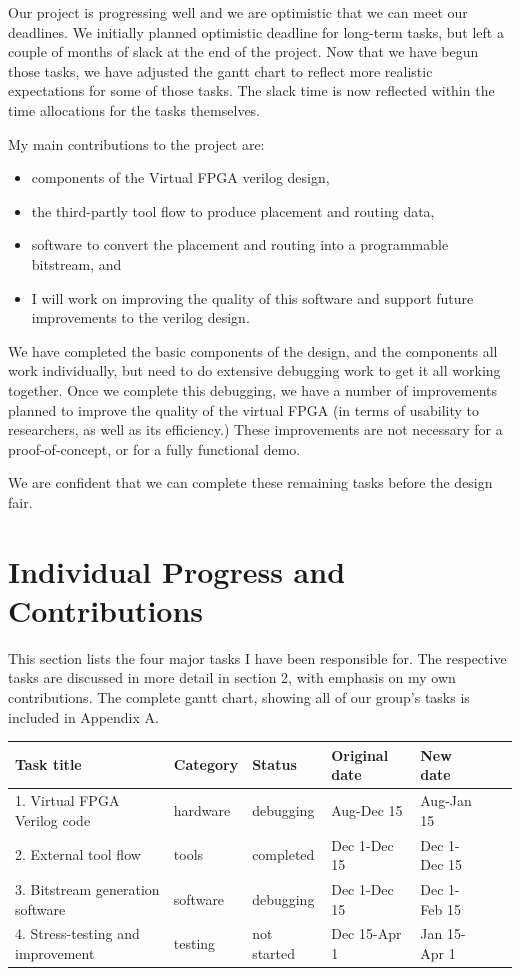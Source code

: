 \documentclass[12pt,letterpaper]{article}
\begin{document}
Our project is progressing well and we are optimistic that we can meet our deadlines.
We initially planned optimistic deadline for long-term tasks, but left a couple of months of slack at the end of the project.
Now that we have begun those tasks, we have adjusted the gantt chart to reflect more realistic expectations for some of those tasks.
The slack time is now reflected within the time allocations for the tasks themselves.

My main contributions to the project are:
\begin{itemize}
\item components of the Virtual FPGA verilog design,
\item the third-partly tool flow to produce placement and routing data,
\item software to convert the placement and routing into a programmable bitstream, and
\item I will work on improving the quality of this software and support future improvements to the verilog design.
\end{itemize}

We have completed the basic components of the design, and the components all work individually, but need to do extensive debugging work to get it all working together.
Once we complete this debugging, we have a number of improvements planned to improve the quality of the virtual FPGA (in terms of usability to researchers, as well as its efficiency.)
These improvements are not necessary for a proof-of-concept, or for a fully functional demo.

We are confident that we can complete these remaining tasks before the design fair.




\pagebreak
{}




\section{Individual Progress and Contributions}

This section lists the four major tasks I have been responsible for.
The respective tasks are discussed in more detail in section 2, with emphasis on my own contributions.
The complete gantt chart, showing all of our group's tasks is included in Appendix A.

\begin{tabular}{|l|l|l|l|l|l|l|}
\hline
\textbf{Task title} & \textbf{Category} & \textbf{Status} & \textbf{Original date} & \textbf{New date} \\ \hline
\hline
1. Virtual FPGA Verilog code & hardware & debugging & Aug-Dec 15 & Aug-Jan 15 \\ \hline
2. External tool flow & tools & completed & Dec 1-Dec 15 & Dec 1-Dec 15 \\ \hline
3. Bitstream generation software & software & debugging & Dec 1-Dec 15 & Dec 1-Feb 15 \\ \hline
4. Stress-testing and improvement & testing & not started & Dec 15-Apr 1 & Jan 15-Apr 1 \\ \hline
\end{tabular}
\end{document}
